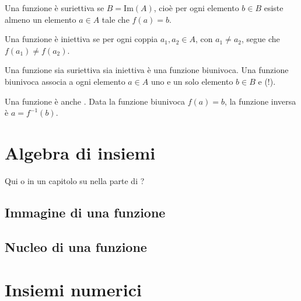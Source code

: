 \documentclass[letterpaper,10pt,italian]{jupyterBook}
\begin{document}
\sphinxAtStartPar
{} Una funzione è suriettiva se \(B = \text{Im}(A)\), cioè per ogni elemento \(b \in B\) esiste almeno un elemento \(a \in A\) tale che \(f(a) = b\).

\sphinxAtStartPar
{} Una funzione è iniettiva se per ogni coppia \(a_1, a_2 \in A\), con \(a_1 \ne a_2\), segue che \(f(a_1) \ne f(a_2)\).

\sphinxAtStartPar
{} Una funzione sia suriettiva sia iniettiva è una funzione biunivoca. Una funzione biunivoca associa a ogni elemento \(a \in A\) uno e un solo elemento \(b \in B\) e (!).

\sphinxAtStartPar
Una funzione  è anche . Data la funzione biunivoca \(f(a) = b\), la funzione inversa è \(a = f^{-1}(b)\).


\section{Algebra di insiemi}
\label{\detokenize{ch/set:algebra-di-insiemi}}\label{\detokenize{ch/set:math-hs-set-algebra}}
\sphinxAtStartPar
{} Qui o in un capitolo su {\hyperref[\detokenize{ch/algebra/set-algebra-link:math-hs-algebra-set-link}]{}} nella parte di {\hyperref[\detokenize{ch/algebra:math-hs-algebra}]{}}?


\subsection{Immagine di una funzione}
\label{\detokenize{ch/set:immagine-di-una-funzione}}\label{\detokenize{ch/set:math-hs-fun-range}}

\subsection{Nucleo di una funzione}
\label{\detokenize{ch/set:nucleo-di-una-funzione}}\label{\detokenize{ch/set:math-hs-fun-null}}

\section{Insiemi numerici}
\label{\detokenize{ch/set:insiemi-numerici}}\label{\detokenize{ch/set:math-hs-set-numbers}}
\end{document}
